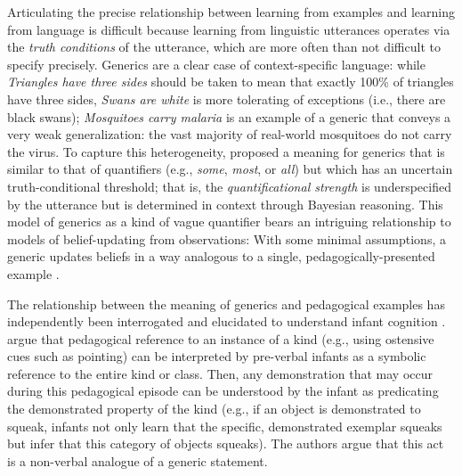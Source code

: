 \documentclass[10pt,letterpaper]{article}
\newcommand{\mht}[1]{\textcolor{Blue}{[mht: #1]}}
\begin{document}
Articulating the precise relationship between learning from examples and learning from language is difficult because learning from linguistic utterances operates via the \emph{truth conditions} of the utterance, which are more often than not difficult to specify precisely. %
Generics are a clear case of context-specific language:  while \emph{Triangles have three sides} should be taken to mean that exactly 100\% of triangles have three sides, \emph{Swans are white} is more tolerating of exceptions (i.e., there are black swans); \emph{Mosquitoes carry malaria} is an example of a generic that conveys a very weak generalization: the vast majority of real-world mosquitoes do not carry the virus. 
To capture this heterogeneity,  proposed a meaning for generics that is similar to that of quantifiers (e.g., \emph{some}, \emph{most}, or \emph{all}) but which has an uncertain truth-conditional threshold; that is, the \emph{quantificational strength} is underspecified by the utterance but is determined in context through Bayesian reasoning. 
This model of generics as a kind of vague quantifier bears an intriguing relationship to models of belief-updating from observations: With some minimal assumptions, a generic updates beliefs in a way analogous to a single, pedagogically-presented example \cite{tessler2020learning}. 



The relationship between the meaning of generics and pedagogical examples has independently been interrogated and elucidated to understand infant cognition \cite{csibra2015nonverbal}.
 argue that pedagogical reference to an instance of a kind (e.g., using ostensive cues such as pointing) can be interpreted by pre-verbal infants as a symbolic reference to the entire kind or class.  
Then, any demonstration that may occur during this pedagogical episode can be understood by the infant as predicating the demonstrated property of the kind (e.g., if an object is demonstrated to squeak, infants not only learn that the specific, demonstrated exemplar squeaks but infer that this category of objects squeaks).
The authors argue that this act is a non-verbal analogue of a generic statement.
\end{document}
